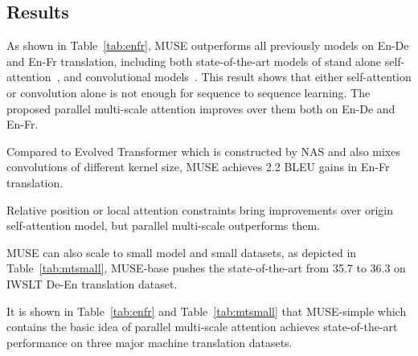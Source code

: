 \documentclass{article} %
\begin{document}
\subsection{Results}

As shown in Table~\ref{tab:enfr}, MUSE outperforms all previously  models on En-De and En-Fr translation, including both  state-of-the-art models of stand alone self-attention~\citep{vaswani2017attention,ott2018scaling}, and convolutional models~\citep{gehring2017convolutional,kaiser2017depthwise,wu2019pay}. This result shows that either self-attention or convolution alone is not enough for sequence to sequence learning. The proposed parallel multi-scale attention improves over them both on En-De and En-Fr.

Compared to Evolved Transformer \citep{so2019evolved} which is constructed by NAS and also mixes convolutions of different kernel size, MUSE achieves 2.2 BLEU gains in En-Fr translation.

Relative position or local attention constraints bring improvements over origin self-attention model, but parallel multi-scale outperforms them.

MUSE can also scale to small model and small datasets, as depicted in Table~\ref{tab:mtsmall}, MUSE-base pushes the state-of-the-art from 35.7 to 36.3 on IWSLT De-En translation dataset.

It is shown in Table~\ref{tab:enfr} and Table~\ref{tab:mtsmall} that MUSE-simple which contains the  basic idea of parallel multi-scale attention achieves state-of-the-art performance on three major machine translation datasets.
\end{document}
